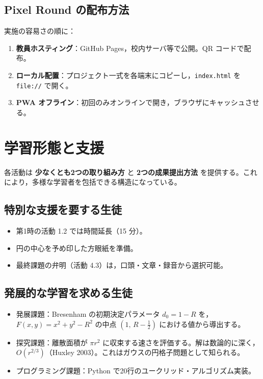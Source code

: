 \documentclass[12pt,a4paper]{scrartcl}
\newcommand{\acc}[1]{\textcolor{accent}{\textbf{#1}}}
\begin{document}
\subsection{Pixel Round の配布方法}

実施の容易さの順に：

\begin{enumerate}[leftmargin=1.5em,itemsep=0.15em,topsep=0.3em]
  \item \textbf{教員ホスティング}：GitHub Pages，校内サーバ等で公開。QR コードで配布。
  \item \textbf{ローカル配置}：プロジェクト一式を各端末にコピーし，\texttt{index.html} を \texttt{file://} で開く。
  \item \textbf{PWA オフライン}：初回のみオンラインで開き，ブラウザにキャッシュさせる。
\end{enumerate}

\section{学習形態と支援}\label{sec:bunka}

各活動は \acc{少なくとも2つの取り組み方} と \acc{2つの成果提出方法} を提供する。これにより，多様な学習者を包括できる構造になっている。

\subsection{特別な支援を要する生徒}
\begin{itemize}[leftmargin=1.3em,itemsep=0.15em,topsep=0.3em]
  \item 第1時の活動 1.2 では時間延長（15 分）。
  \item 円の中心を予め印した方眼紙を準備。
  \item 最終課題の弁明（活動 4.3）は，口頭・文章・録音から選択可能。
\end{itemize}

\subsection{発展的な学習を求める生徒}
\begin{itemize}[leftmargin=1.3em,itemsep=0.15em,topsep=0.3em]
  \item 発展課題：Bresenham の初期決定パラメータ $d_0 = 1 - R$ を，$F(x, y) = x^2 + y^2 - R^2$ の中点 $(1,\, R - \tfrac{1}{2})$ における値から導出する。
  \item 探究課題：離散面積が $\pi r^2$ に収束する速さを評価する。解は数論的に深く，$O(r^{2/3})$（Huxley 2003）。これはガウスの円格子問題として知られる。
  \item プログラミング課題：Python で20行のユークリッド・アルゴリズム実装。
\end{itemize}
\end{document}
